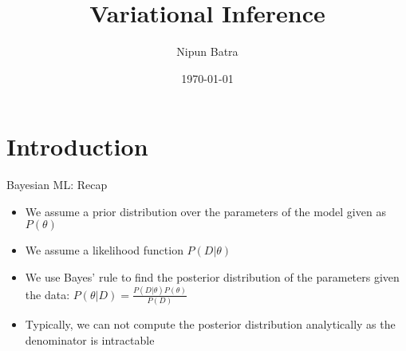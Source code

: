 \documentclass[handout]{beamer}
\begin{document}
\title{Variational Inference}
\author{Nipun Batra}
\date{\today}
\maketitle

\section{Introduction}

\begin{frame}{Bayesian ML: Recap}
    \begin{itemize}
        \item We assume a prior distribution over the parameters of the model given as $P(\theta)$
        \item We assume a likelihood function $P(D|\theta)$
        \item We use Bayes' rule to find the posterior distribution of the parameters given the data: $P(\theta|D) = \frac{P(D|\theta)P(\theta)}{P(D)}$
        \item Typically, we can not compute the posterior distribution analytically as the denominator is intractable
    \end{itemize}
    
\end{frame}
\end{document}
